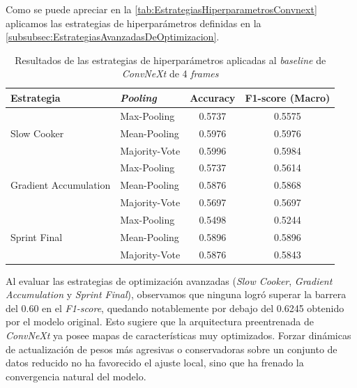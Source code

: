 Como se puede apreciar en la \autoref{tab:EstrategiasHiperparametrosConvnext} aplicamos las estrategias de hiperparámetros definidas en la \autoref{subsubsec:EstrategiasAvanzadasDeOptimizacion}.

\begin{table}[H]
    \centering
    \begin{tabular}{llcc}
        \toprule
        \textbf{Estrategia} & \textbf{\textit{Pooling}} & \textbf{Accuracy} & \textbf{F1-score (Macro)} \\
        \midrule
        \multirow{3}{*}{Slow Cooker} 
            & Max-Pooling & 0.5737 & 0.5575 \\
            & Mean-Pooling   & 0.5976 & 0.5976 \\
            & Majority-Vote   & 0.5996 & 0.5984 \\
        \midrule
        \multirow{3}{*}{Gradient Accumulation}
            & Max-Pooling       & 0.5737 & 0.5614 \\
            & Mean-Pooling       & 0.5876 & 0.5868 \\
            & Majority-Vote       & 0.5697 & 0.5697 \\
        \midrule
        \multirow{3}{*}{Sprint Final}
            & Max-Pooling       & 0.5498 & 0.5244 \\
            & Mean-Pooling       & 0.5896 & 0.5896 \\
            & Majority-Vote       & 0.5876 & 0.5843 \\
        \bottomrule
    \end{tabular}
    \caption{Resultados de las estrategias de hiperparámetros aplicadas al \textit{baseline} de \textit{ConvNeXt} de 4 \textit{frames}}
    \label{tab:EstrategiasHiperparametrosConvnext}
\end{table}

Al evaluar las estrategias de optimización avanzadas (\textit{Slow Cooker}, \textit{Gradient Accumulation} y \textit{Sprint Final}), observamos que ninguna logró superar la barrera del 0.60 en el \textit{F1-score}, quedando notablemente por debajo del 0.6245 obtenido por el modelo original. Esto sugiere que la arquitectura preentrenada de \textit{ConvNeXt} ya posee mapas de características muy optimizados. Forzar dinámicas de actualización de pesos más agresivas o conservadoras sobre un conjunto de datos reducido no ha favorecido el ajuste local, sino que ha frenado la convergencia natural del modelo.  

